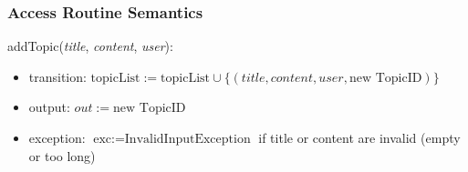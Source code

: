 \documentclass[12pt, titlepage]{article}
\begin{document}
\subsubsection{Access Routine Semantics}

\noindent addTopic(\textit{title}, \textit{content}, \textit{user}):
\begin{itemize}
\item transition: \( \text{topicList} := \text{topicList} \cup \{(\textit{title}, \textit{content}, \textit{user}, \text{new TopicID})\} \)
\item output: \( out := \text{new TopicID} \)
\item exception: \( \text{exc} := \text{InvalidInputException} \) if title or content are invalid (empty or too long)
\end{itemize}
\end{document}
